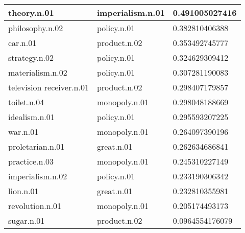 \begin{center}
\begin{tabular}{ | l | l | l |}
theory.n.01 & imperialism.n.01 & 0.491005027416 \\ \hline
philosophy.n.02 & policy.n.01 & 0.382810406388 \\ \hline
car.n.01 & product.n.02 & 0.353492745777 \\ \hline
strategy.n.02 & policy.n.01 & 0.324629309412 \\ \hline
materialism.n.02 & policy.n.01 & 0.307281190083 \\ \hline
television receiver.n.01 & product.n.02 & 0.298407179857 \\ \hline
toilet.n.04 & monopoly.n.01 & 0.298048188669 \\ \hline
idealism.n.01 & policy.n.01 & 0.295593207225 \\ \hline
war.n.01 & monopoly.n.01 & 0.264097390196 \\ \hline
proletarian.n.01 & great.n.01 & 0.262634686841 \\ \hline
practice.n.03 & monopoly.n.01 & 0.245310227149 \\ \hline
imperialism.n.02 & policy.n.01 & 0.233190306342 \\ \hline
lion.n.01 & great.n.01 & 0.232810355981 \\ \hline
revolution.n.01 & monopoly.n.01 & 0.205174493173 \\ \hline
sugar.n.01 & product.n.02 & 0.0964554176079 \\ \hline
\end{tabular}
\end{center}